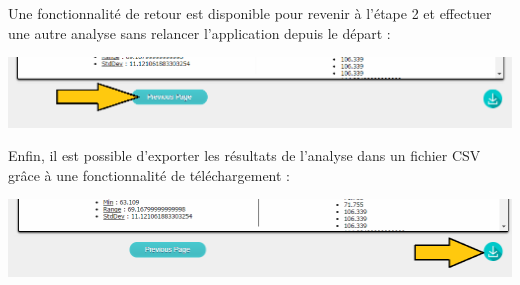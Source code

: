 		Une fonctionnalité de retour est disponible pour revenir à l'étape 2 et effectuer une autre analyse sans relancer l'application depuis le départ :
		\begin{center}\includegraphics[scale=0.50]{fenetre3prec.png}\end{center}\vspace{4em}
			
		Enfin, il est possible d'exporter les résultats de l'analyse dans un fichier CSV grâce à une fonctionnalité de téléchargement :
		\begin{center}\includegraphics[scale=0.50]{fenetre3Download.png}\end{center}


